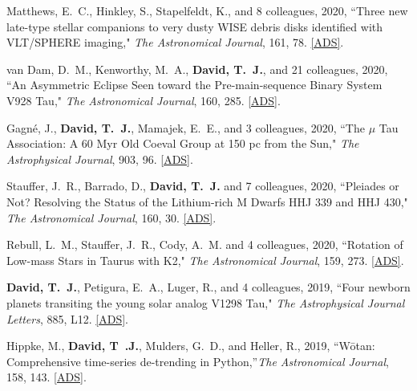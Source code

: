 \item {Matthews}, E.~C., {Hinkley}, S., {Stapelfeldt}, K., and 8 colleagues, 2020, ``{Three new late-type stellar companions to very dusty WISE debris disks identified with VLT/SPHERE imaging}," \textit{The Astronomical Journal}, 161, 78. \href{https://ui.adsabs.harvard.edu/abs/2021AJ....161...78M/abstract}{[ADS]}.

\item {van Dam}, D.~M., {Kenworthy}, M.~A., {\bf {David}, T.~J.}, and 21 colleagues, 2020, ``{An Asymmetric Eclipse Seen toward the Pre-main-sequence Binary System V928 Tau}," \textit{The Astronomical Journal}, 160, 285. \href{https://ui.adsabs.harvard.edu/abs/2020AJ....160..285V/abstract}{[ADS]}.

\item {Gagn{\'e}}, J., {\bf {David}, T.~J.}, {Mamajek}, E.~E., and 3 colleagues, 2020, ``{The {\ensuremath{\mu}} Tau Association: A 60 Myr Old Coeval Group at 150 pc from the Sun}," \textit{The Astrophysical Journal}, 903, 96. \href{https://ui.adsabs.harvard.edu/abs/2020ApJ...903...96G/abstract}{[ADS]}.

\item {Stauffer}, J.~R., {Barrado}, D., {\bf {David}, T.~J.} and 7 colleagues, 2020, ``{Pleiades or Not? Resolving the Status of the Lithium-rich M Dwarfs HHJ 339 and HHJ 430}," \textit{The Astronomical Journal}, 160, 30. \href{https://ui.adsabs.harvard.edu/abs/2020AJ....160...30S/abstract}{[ADS]}.

\item {Rebull}, L.~M., {Stauffer}, J.~R., {Cody}, A.~M. and 4 colleagues, 2020, ``{Rotation of Low-mass Stars in Taurus with K2}," \textit{The Astronomical Journal}, 159, 273. \href{https://ui.adsabs.harvard.edu/abs/2020AJ....159..273R/abstract}{[ADS]}.

\item {\bf {David}, T.~J.}, {Petigura}, E.~A., {Luger}, R., and 4 colleagues, 2019, ``{Four newborn planets transiting the young solar analog V1298 Tau}," \textit{The Astrophysical Journal Letters}, 885, L12. \href{https://ui.adsabs.harvard.edu/abs/2019arXiv191004563D/abstract}{[ADS]}.

\item {Hippke}, M., \textbf{{David}, T~.J.}, {Mulders}, G.~D., and {Heller}, R., 2019, ``{W\={o}tan: Comprehensive time-series de-trending in Python},''\textit{The Astronomical Journal}, 158, 143. \href{https://ui.adsabs.harvard.edu/abs/2019AJ....158..143H/abstract}{[ADS]}.

